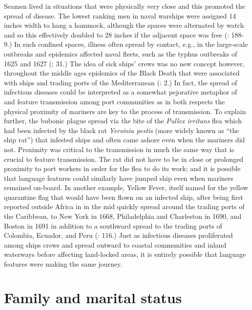 Seamen lived in situations that were physically very close and this promoted the spread of disease. The lowest ranking men in naval warships were assigned 14 inches width to hang a hammock, although the spaces were alternated by watch and so this effectively doubled to 28 inches if the adjacent space was free (\citealt{AdkinsAdkins2008}: 188-9.) In such confined spaces, illness often spread by contact, e.g., in the  large-scale outbreaks and epidemics affected naval fleets, such as the typhus outbreaks of 1625 and 1627 (\citealt{Brown2011}: 31.) The idea of sick ships’ crews was no new concept however, throughout the middle ages epidemics of the Black Death that were associated with ships and trading ports of the Mediterranean (\citealt{Brown2011}: 2.) In fact, the spread of infectious diseases could be interpreted as a somewhat pejorative metaphor of  and feature transmission among port communities as in both respects the physical proximity of mariners are key to the process of transmission. To explain further, the bubonic plague spread via the bite of the \textit{Pullex irritans} flea which had been infected by the black rat \textit{Yersinia pestis} (more widely known as “the ship rat”) that infested  ships and often came ashore even when the mariners did not. Proximity was critical to the transmission in much the same way that  is crucial to feature transmission. The rat did not have to be in close or prolonged proximity to port workers in order for the flea to do its work; and it is possible that language features could similarly have jumped ship even when mariners remained on-board. In another example, Yellow Fever, itself named for the yellow quarantine flag that would have been flown on an infected ship, after being first reported outside Africa in  in the mid  quickly spread around the trading ports of the Caribbean, to New York in 1668, Philadelphia and Charleston in 1690, and Boston in 1691 in addition to a southward spread to the trading ports of Colombia, Ecuador, and Peru (\citealt{Brown2011}: 116.) Just as infectious diseases proliferated among ships crews and spread outward to coastal communities and inland waterways before affecting land-locked areas, it is entirely possible that language features were making the same journey. 

\section{{Family and marital status}}\label{sec:3.6}

